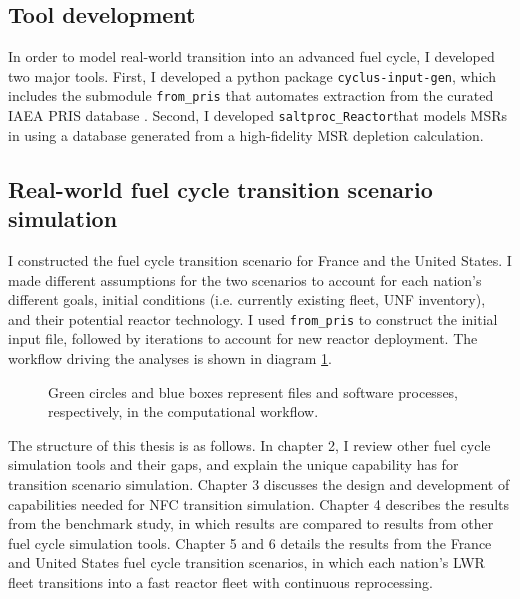 \subsection{Tool development}
In order to model real-world transition into an advanced
fuel cycle, I developed two major tools. First, I developed a python package \texttt{cyclus-input-gen},
which includes the submodule \texttt{from\_pris}
that automates extraction from the curated \gls{IAEA} \gls{PRIS} database
\cite{iaea_nuclear_2018}. Second, I developed \texttt{saltproc\_Reactor}that models \glspl{MSR}
in \Cyclus using a database generated from a high-fidelity \gls{MSR} depletion calculation.

\subsection{Real-world fuel cycle transition scenario simulation}
I constructed the fuel cycle transition scenario for France and the United States.
I made different assumptions for the two scenarios to account for each nation's different goals,
initial conditions (i.e. currently existing fleet, \gls{UNF} inventory), and their potential reactor
technology. I used \texttt{from\_pris} to construct the initial \Cyclus input file,
followed by iterations to account for new reactor deployment. The workflow driving the analyses is shown in diagram \ref{diag:workflow}.


\begin{figure}
        \centering
{}
\caption{Green circles and blue boxes represent files and software 
processes, respectively, in the computational workflow.}
\label{diag:workflow}
\end{figure}


The structure of this thesis is as follows. In chapter 2, I review other fuel cycle simulation
tools and their gaps, and explain the unique capability \Cyclus
has for transition scenario simulation.
Chapter 3 discusses the design and
development of capabilities needed for \gls{NFC} transition simulation.
Chapter 4 describes the results from the benchmark study, in which \Cyclus results are compared
to results from other fuel cycle simulation tools.
Chapter 5 and 6 details the results from the France and United States fuel cycle
transition scenarios, in which each nation's \gls{LWR} fleet transitions into
a fast reactor fleet with continuous reprocessing.
